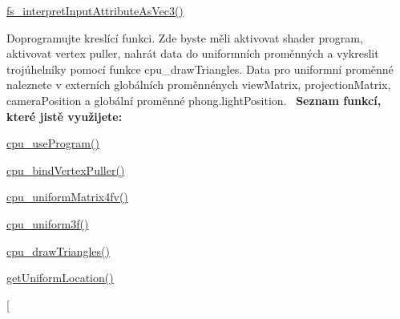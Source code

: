 \begin{DoxyRefList}
\begin{DoxyItemize}
\item \hyperlink{program_8h_a132afaeef0a64d93305bb2df3f35a524}{fs\+\_\+interpret\+Input\+Attribute\+As\+Vec3()}  
\end{DoxyItemize}
\item[\label{todo__todo000002}%
\hypertarget{todo__todo000002}{}%
Global \hyperlink{group__cpu__side_gafea3b0614db94d611ae817685375c39c}{phong\+\_\+on\+Draw} (S\+D\+L\+\_\+\+Surface $\ast$surface)]Doprogramujte kreslící funkci. Zde byste měli aktivovat shader program, aktivovat vertex puller, nahrát data do uniformních proměnných a vykreslit trojúhelníky pomocí funkce cpu\+\_\+draw\+Triangles. Data pro uniformní proměnné naleznete v externích globálních proměnnénych view\+Matrix, projection\+Matrix, camera\+Position a globální proměnné phong.\+light\+Position.~\newline
 {\bfseries Seznam funkcí, které jistě využijete\+:}
\begin{DoxyItemize}
\item \hyperlink{program_8h_a497d97730640942bffcc3cd9f266f146}{cpu\+\_\+use\+Program()}
\item \hyperlink{vertexPuller_8h_a27eee6237125ddc21c7d9b996f5af84e}{cpu\+\_\+bind\+Vertex\+Puller()}
\item \hyperlink{uniforms_8h_a44cfae8c541efcc181e3947511df7f7a}{cpu\+\_\+uniform\+Matrix4fv()}
\item \hyperlink{uniforms_8h_abe070ee9f74f785a07118788fcf4219e}{cpu\+\_\+uniform3f()}
\item \hyperlink{student__pipeline_8c_aa47deaa10ce52221ab24e864a11426af}{cpu\+\_\+draw\+Triangles()}
\item \hyperlink{uniforms_8h_a6ea94982618b1c339a97a528b0670a53}{get\+Uniform\+Location()}  
\end{DoxyItemize}
\item[\label{todo__todo000001}%
\hypertarget{todo__todo000001}{}%

\end{DoxyRefList}
